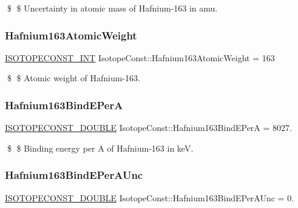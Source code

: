 \$ \$ Uncertainty in atomic mass of Hafnium-\/163 in amu. \mbox{\label{group___isotope_const-_hafnium-_hf163_gab0395efeda222aded7b8691a1c97d003}} 
\subsubsection{\texorpdfstring{Hafnium163\+Atomic\+Weight}{Hafnium163AtomicWeight}}
{\footnotesize\ttfamily \mbox{\hyperlink{group___isotope_const-_macros_ga5f18360b3e99483a35c32d789e62621c}{I\+S\+O\+T\+O\+P\+E\+C\+O\+N\+S\+T\+\_\+\+I\+NT}} Isotope\+Const\+::\+Hafnium163\+Atomic\+Weight = 163}

\$ \$ Atomic weight of Hafnium-\/163. \mbox{\label{group___isotope_const-_hafnium-_hf163_ga82a85c514c22ae602f97b22e7be59585}} 
\subsubsection{\texorpdfstring{Hafnium163\+Bind\+E\+PerA}{Hafnium163BindEPerA}}
{\footnotesize\ttfamily \mbox{\hyperlink{group___isotope_const-_macros_ga8f45a7272ce02c0b4c65c44636ed719a}{I\+S\+O\+T\+O\+P\+E\+C\+O\+N\+S\+T\+\_\+\+D\+O\+U\+B\+LE}} Isotope\+Const\+::\+Hafnium163\+Bind\+E\+PerA = 8027.}

\$ \$ Binding energy per A of Hafnium-\/163 in keV. \mbox{\label{group___isotope_const-_hafnium-_hf163_gaa62ba05d728ea10881996a2cc1f48c7d}} 
\subsubsection{\texorpdfstring{Hafnium163\+Bind\+E\+Per\+A\+Unc}{Hafnium163BindEPerAUnc}}
{\footnotesize\ttfamily \mbox{\hyperlink{group___isotope_const-_macros_ga8f45a7272ce02c0b4c65c44636ed719a}{I\+S\+O\+T\+O\+P\+E\+C\+O\+N\+S\+T\+\_\+\+D\+O\+U\+B\+LE}} Isotope\+Const\+::\+Hafnium163\+Bind\+E\+Per\+A\+Unc = 0.}

